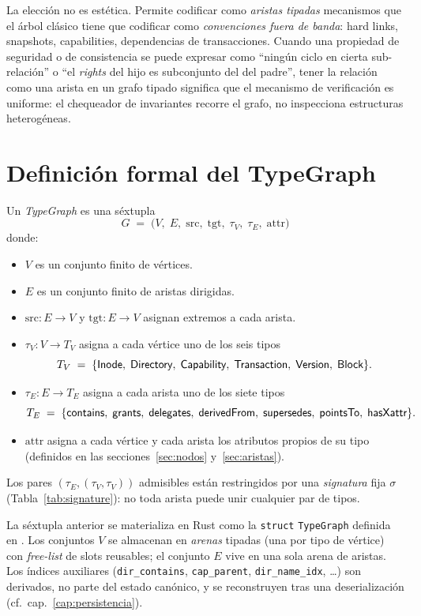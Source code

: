 La elección no es estética. Permite codificar como \emph{aristas tipadas}
mecanismos que el árbol clásico tiene que codificar como \emph{convenciones
fuera de banda}: hard links, snapshots, capabilities, dependencias de
transacciones. Cuando una propiedad de seguridad o de consistencia se
puede expresar como ``ningún ciclo en cierta sub-relación'' o ``el
\emph{rights} del hijo es subconjunto del del padre'', tener la relación
como una arista en un grafo tipado significa que el mecanismo de
verificación es uniforme: el chequeador de invariantes recorre el grafo,
no inspecciona estructuras heterogéneas.

\section{Definición formal del TypeGraph}

\begin{defn}[TypeGraph]
\label{def:typegraph}
Un \emph{TypeGraph} es una séxtupla
\[
  G \;=\; \bigl(V,\; E,\; \mathrm{src},\; \mathrm{tgt},\; \tau_V,\; \tau_E,\; \mathrm{attr}\bigr)
\]
donde:
\begin{itemize}
  \item $V$ es un conjunto finito de vértices.
  \item $E$ es un conjunto finito de aristas dirigidas.
  \item $\mathrm{src}: E \to V$ y $\mathrm{tgt}: E \to V$ asignan extremos a
    cada arista.
  \item $\tau_V: V \to T_V$ asigna a cada vértice uno de los seis tipos
    \[
      T_V \;=\; \{\textsf{Inode},\; \textsf{Directory},\; \textsf{Capability},\; \textsf{Transaction},\; \textsf{Version},\; \textsf{Block}\}.
    \]
  \item $\tau_E: E \to T_E$ asigna a cada arista uno de los siete tipos
    \[
      T_E \;=\; \{\textsf{contains},\; \textsf{grants},\; \textsf{delegates},\; \textsf{derivedFrom},\; \textsf{supersedes},\; \textsf{pointsTo},\; \textsf{hasXattr}\}.
    \]
  \item $\mathrm{attr}$ asigna a cada vértice y cada arista los atributos
    propios de su tipo (definidos en las secciones~\ref{sec:nodos}
    y~\ref{sec:aristas}).
\end{itemize}
Los pares $(\tau_E, (\tau_V, \tau_V))$ admisibles están restringidos por
una \emph{signatura} fija $\sigma$ (Tabla~\ref{tab:signature}): no toda
arista puede unir cualquier par de tipos.
\end{defn}

\begin{observacion}
La séxtupla anterior se materializa en Rust como la \texttt{struct}
\texttt{TypeGraph} definida en . Los
conjuntos $V$ se almacenan en \emph{arenas} tipadas (una por tipo de
vértice) con \emph{free-list} de slots reusables; el conjunto $E$ vive en
una sola arena de aristas. Los índices auxiliares (\texttt{dir\_contains},
\texttt{cap\_parent}, \texttt{dir\_name\_idx}, \dots) son derivados, no
parte del estado canónico, y se reconstruyen tras una deserialización
(cf.\ cap.~\ref{cap:persistencia}).
\end{observacion}


